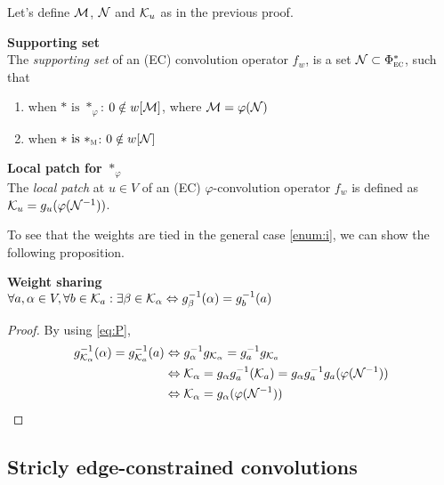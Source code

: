 Let's define $\mathcal{M}$, $\mathcal{N}$ and $\mathcal{K}_u$ as in the previous proof.
\begin{definition}\textbf{Supporting set}\\
The \emph{supporting set} of an (EC) convolution operator $f_w$, is a set $\mathcal{N} \subset \Phi^*_{\operatorname{\textsc{ec}}}$, such that
\begin{enumerate}[label=(\roman*)]
  \item when $\ast \text{ is } \ast_\varphi$: $0 \notin w[\mathcal{M}]$, where $\mathcal{M}= \varphi(\mathcal{N})$ \label{enum:i}
  \item when $\ast \text{ is } \ast_{\operatorname{\textsc{m}}}$: $0 \notin w[\mathcal{N}]$ \label{enum:ii}
\end{enumerate}
\end{definition}

\begin{definition}\textbf{Local patch for $\ast_\varphi$}\\
The \emph{local patch} at $u \in V$ of an (EC) $\varphi$-convolution operator $f_w$ is defined as $\mathcal{K}_u = g_u(\varphi(\mathcal{N}^{-1}))$.
\end{definition}

To see that the weights are tied in the general case \ref{enum:i}, we can show the following proposition.

\begin{proposition}\textbf{Weight sharing}\\
$\forall a, \alpha \in V, \forall b \in \mathcal{K}_a: \exists \beta \in \mathcal{K}_{\alpha} \Leftrightarrow g_{\beta}^{-1}(\alpha) = g_{b}^{-1}(a)$
\end{proposition}
\begin{proof}
By using \eqref{eq:P},
\begin{align*}
g_{\mathcal{K}_\alpha}^{-1}(\alpha) = g_{\mathcal{K}_a}^{-1}(a)
	& \Leftrightarrow  g_{\alpha}^{-1}g_{\mathcal{K}_{\alpha}} = g_a^{-1}g_{\mathcal{K}_a}\\
	& \Leftrightarrow  \mathcal{K}_{\alpha} = g_{\alpha}g_a^{-1}(\mathcal{K}_a) = g_{\alpha}g_a^{-1}g_a(\varphi(\mathcal{N}^{-1}))\\
	& \Leftrightarrow  \mathcal{K}_{\alpha} = g_{\alpha}(\varphi(\mathcal{N}^{-1}))
\end{align*}
\end{proof}

\subsection{Stricly edge-constrained convolutions}

